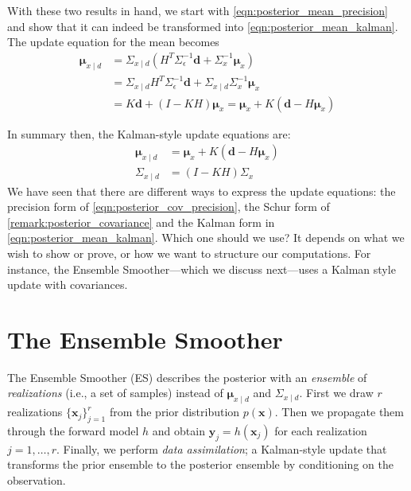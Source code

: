 \documentclass[12pt, a4paper]{article}
\theoremstyle{spaced}
\theoremstyle{spaceddef}
\numberwithin{equation}{section}
\begin{document}
With these two results in hand, we start with \cref{eqn:posterior_mean_precision} and show that it can indeed be transformed into \cref{eqn:posterior_mean_kalman}.
The update equation for the mean becomes
\begin{align*}
    \bm{\mu}_{x \mid d} &=
    \Sigma_{x \mid d} \left(
    H^T \Sigma_\epsilon^{-1} \bm{d} + \Sigma_x^{-1} \bm{\mu}_x
    \right) \\
    &=
    \Sigma_{x \mid d}
    H^T \Sigma_\epsilon^{-1} \bm{d} +  \Sigma_{x \mid d} \Sigma_x^{-1} \bm{\mu}_x
     \\
    & =K \bm{d} + (I - KH) \bm{\mu}_x =  \bm{\mu}_x + K (\bm{d} - H\bm{\mu}_x )
\end{align*}

In summary then, the Kalman-style update equations are:
\begin{align*}
    \bm{\mu}_{x \mid d}
    & = \bm{\mu}_x + K (\bm{d} - H\bm{\mu}_x )
    \\
    \Sigma_{x \mid d} &= (I - KH) \Sigma_x
\end{align*}
We have seen that there are different ways to express the update equations: the precision form of \cref{eqn:posterior_cov_precision}, the Schur form of \cref{remark:posterior_covariance} and the Kalman form in \cref{eqn:posterior_mean_kalman}.
Which one should we use?
It depends on what we wish to show or prove, or how we want to structure our computations.
For instance, the Ensemble Smoother---which we discuss next---uses a Kalman style update with covariances.

\section{The Ensemble Smoother}
The Ensemble Smoother (ES) describes the posterior with an \emph{ensemble} of \emph{realizations} (i.e., a set of samples) instead of $\bm{\mu}_{x \mid d}$ and $\Sigma_{x \mid d}$.
First we draw $r$ realizations $\{\bm{x}_j\}_{j=1}^{r}$ from the prior distribution $p(\bm{x})$.
Then we propagate them through the forward model $h$ and obtain $\bm{y}_j = h(\bm{x}_j)$ for each realization $j=1, \ldots, r$.
Finally, we perform \emph{data assimilation}; a Kalman-style update that transforms the prior ensemble to the posterior ensemble by conditioning on the observation.
\end{document}
